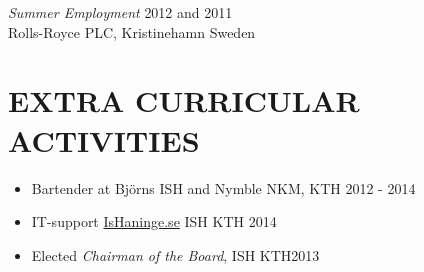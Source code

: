 \documentclass[margin]{res}
\begin{document}
\begin{resume}
                
     {\sl Summer Employment } \hfill 2012 and 2011 \\
                 Rolls-Royce PLC, Kristinehamn Sweden


\section{EXTRA CURRICULAR ACTIVITIES}
\begin{itemize}  
            \item Bartender at Björns ISH and Nymble NKM, KTH \hfill 2012 - 2014 
            \item IT-support \href{ishaninge.se}{IsHaninge.se}  ISH KTH \hfill 2014
            \item Elected {\it Chairman of the Board},  ISH KTH\hfill 2013 

\end{itemize}

\end{resume}
\end{document}
